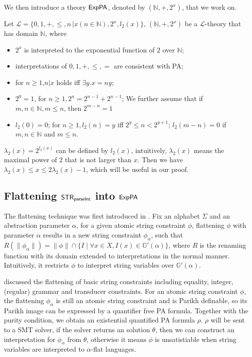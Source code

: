 We then introduce a theory {${\sf ExpPA}$}, denoted by $(\mathbb{N},+,2^x)$, that we work on.
\begin{definition}
    Let $\mathcal{L}=\{0,1,+,\le,n \, |x(n\in \mathbb{N}),2^x,l_2(x)\}$, 
     $(\mathbb{N},+,2^x)$ be a $\mathcal{L}$-theory that has domain $\mathbb{N}$, where 
    \begin{itemize}
        \item  $2^x$ is interpreted to the exponential function of $2$ over $\mathbb{N}$; 
        \item interpretations of $0,1,+,\le,=$ are consistent with PA;
        \item for $n\ge 1$,$n|x$ holds iff $\exists y.x=ny$;
        \item $2^0=1$, for $n \ge 1, 2^n = 2^{n-1}+2^{n-1}$;
        We further assume that if $m,n\in \mathbb{N}, m\le n$, 
        then $2^{m-n} = 1$
        \item $l_2(0)=0$; for $n \ge 1,l_2(n) = y$ iff $2^y \le n < 2^{y+1}$;  $l_2(m-n) = 0$
        if $m,n\in \mathbb{N}$ and $m\le n$. 
    \end{itemize}
\end{definition}

$\lambda_2(x) = 2^{l_2(x)}$ can be defined by $l_2(x)$,
intuitively, $\lambda_2(x)$ means the maximal power of 2 that is not larger than $x$.
Then we have $\lambda_2(x) \le x \le 2\lambda_2(x)-1$,
which will be useful in our proof. 


\subsection{Flattening ${\sf STR}_{\textsf{parseInt}}$ into ${\sf ExpPA}$}

The flattening technique was first introduced 
in \cite{Abdulla 2017}.
Fix an alphabet $\Sigma$ and an abstraction parameter $\alpha$, 
for a given atomic string constraint $\phi$, 
flattening $\phi$ with parameter $\alpha$ 
results in a new string constraint $\phi_\alpha$,
such that 
$R(\lVert \phi_\alpha \rVert) = \lVert \phi \rVert \cap \{I \mid \forall x\in X, I(x)\in \mathbb{G}'(\alpha)\}$,
where $R$ is the renaming function with its domain extended to interpretations in the normal manner.
Intuitively, it restricts $\phi$ to interpret 
string variables over $\mathbb{G}'(\alpha)$.

\cite{Abdulla 2017} discussed the flattening of basic 
string constraints including equality, integer, (regular) grammar and transducer constraints. 
For an atomic string constraint $\phi$,
the flattening $\phi_\alpha$ is still an atomic string constraint 
and is Parikh definable,
so its Parikh image can be expressed by a quantifier free PA formula.
Together with the purity condition,
we obtain an existential quantified PA formula $\rho$.
$\rho$ will be sent to a SMT solver,
if the solver returns an solution $\theta$,
then we can construct an interpretation for $\phi_\alpha$ from $\theta$,
otherwise it means $\phi$ is unsatistiable when 
string variables are interpreted  to $\alpha$-flat languages.

